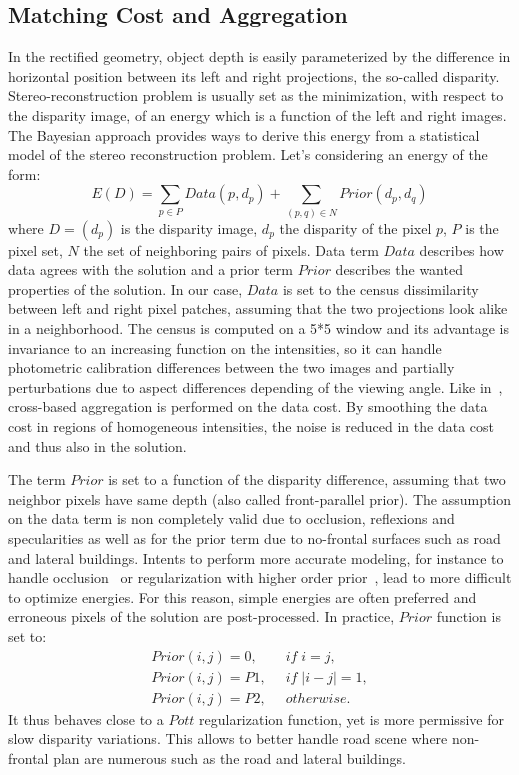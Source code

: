 \documentclass{article}
\begin{document}
\subsection{Matching Cost and Aggregation}

\label{ss:cost}

In the rectified geometry, object depth is easily parameterized by the difference in horizontal position between its left and right projections, the so-called disparity. Stereo-reconstruction problem is usually set as the minimization, with respect to the disparity image, of an energy which is a function of the left and right images. The Bayesian approach provides ways to derive this energy from a statistical model of the stereo reconstruction problem. Let's considering an energy of the form:
\begin{equation}
E(D) = \sum_{p \in P}{Data(p,d_p)} + \sum_{(p,q) \in N}{Prior(d_p,d_q)}
\label{eq:global_en}
\end{equation}
where $D=(d_p)$ is the disparity image, $d_p$ the disparity of the pixel $p$, $P$ is the pixel set, $N$ the set of neighboring pairs of pixels. Data term $Data$ describes how data agrees with the solution and a prior term $Prior$ describes the wanted properties of the solution. In our case, $Data$ is set to the census dissimilarity~\cite{zabih94} between left and right pixel patches, assuming that the two projections look alike in a neighborhood. The census is computed on a 5*5 window and its advantage is invariance to an increasing function on the intensities, so it can handle photometric calibration differences between the two images and partially perturbations due to aspect differences depending of the viewing angle. Like in~\cite{zhang09}, cross-based aggregation is performed on the data cost. By smoothing the data cost in regions of homogeneous intensities, the noise is reduced in the data cost and thus also in the solution.

The term $Prior$ is set to a function of the disparity difference, assuming that two neighbor pixels have same depth (also called front-parallel prior). The assumption on the data term is non completely valid due to occlusion, reflexions and specularities as well as for the prior term due to no-frontal surfaces such as road and lateral buildings. Intents to perform more accurate modeling, for instance to handle occlusion~\cite{kolmogorov01} or regularization with higher order prior~\cite{ranftl12}, lead to more difficult to optimize energies. For this reason, simple energies are often preferred and erroneous pixels of the solution are post-processed. In practice, $Prior$ function is set to:
\begin{equation}
\begin{split}
Prior(i,j) = 0, & \; \; if \; i=j, \\
Prior(i,j) = P1, & \; \; if \; |i-j| = 1, \\
Prior(i,j) = P2, & \; \; otherwise.
\end{split}
\end{equation}
It thus behaves close to a $Pott$ regularization function, yet is more permissive for slow disparity variations. This allows to better handle road scene where non-frontal plan are numerous such as the road and lateral buildings.
\end{document}
